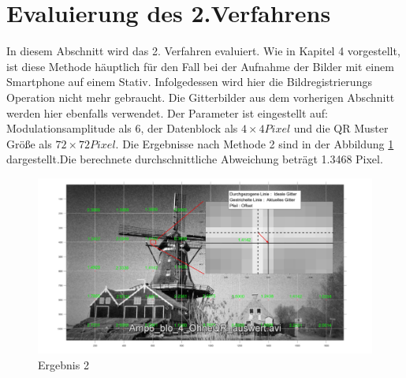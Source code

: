 \section{Evaluierung des 2.Verfahrens}

In diesem Abschnitt wird das 2. Verfahren evaluiert. Wie in Kapitel 4 vorgestellt, ist diese Methode häuptlich für den Fall bei der Aufnahme der Bilder mit einem Smartphone auf einem Stativ. Infolgedessen wird hier die Bildregistrierungs Operation nicht mehr gebraucht. Die Gitterbilder aus dem vorherigen Abschnitt werden hier ebenfalls verwendet. Der Parameter ist eingestellt auf: Modulationsamplitude als 6, der Datenblock als $ 4 \times 4 Pixel$ und die QR Muster Größe als $ 72 \times 72 Pixel $. Die Ergebnisse nach Methode 2 sind in der Abbildung \ref{fig:Ergebnis2} dargestellt.Die berechnete durchschnittliche Abweichung beträgt 1.3468 Pixel. 
\begin{figure}[H]
 \centering 
  \includegraphics[keepaspectratio,width=1.00\textwidth]{images/6_Auswertung/Ergebnis2.pdf}
 \caption{Ergebnis 2}
 \label{fig:Ergebnis2}
\end{figure}